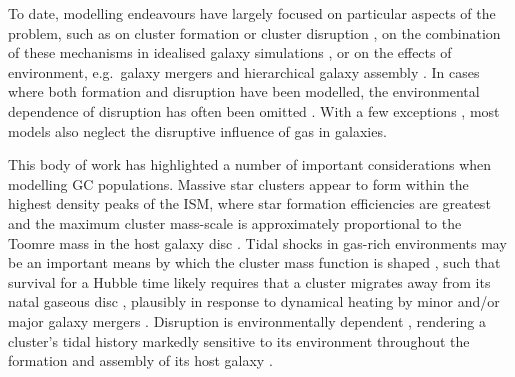\documentclass[fleqn,usenatbib]{mnras}
\begin{document}
To date, modelling endeavours have largely focused on particular aspects of the problem, such as on cluster formation \citep{Kravtsov_and_Gnedin_05, Katz_and_Ricotti_14, Li_and_Gnedin_14, Mistani_et_al_16, Li_et_al_17} or cluster disruption \citep{Gnedin_and_Ostriker_97, Vesperini_97, Baumgardt_98, Prieto_and_Gnedin_08, Rieder_et_al_13}, on the combination of these mechanisms in idealised galaxy simulations \citep{Kruijssen_et_al_11,Kruijssen_et_al_12}, or on the effects of environment, e.g.~galaxy mergers \citep{Li_MacLow_Klessen_04, Kruijssen_et_al_12, Renaud_and_Gieles_13, Renaud_Bournaud_and_Duc_15} and hierarchical galaxy assembly \citep{Beasley_et_al_02, Bekki_et_al_08, Griffen_et_al_10, Tonini_13, Renaud_Agertz_and_Gieles_17}. In cases where both formation and disruption have been modelled, the environmental dependence of disruption has often been omitted \citep{Muratov_and_Gnedin_10}. With a few exceptions \citep[e.g.][]{Elmegreen_10,Kruijssen_et_al_11,Kruijssen_et_al_12,Kruijssen_15}, most models also neglect the disruptive influence of gas in galaxies. 

This body of work has highlighted a number of important considerations when modelling GC populations. Massive star clusters appear to form within the highest density peaks of the ISM, where star formation efficiencies are greatest \citep{Elmegreen_and_Efremov_97, Elmegreen_08, Kruijssen_12} and the maximum cluster mass-scale is approximately proportional to the Toomre mass in the host galaxy disc \citep[but with important deviations, see][]{Reina-Campos_and_Kruijssen_17}. Tidal shocks in gas-rich environments may be an important means by which the cluster mass function is shaped \citep{Elmegreen_10, Kruijssen_15}, such that survival for a Hubble time likely requires that a cluster migrates away from its natal gaseous disc \citep{Kruijssen_14}, plausibly in response to dynamical heating by minor and/or major galaxy mergers \citep[e.g.][]{Kravtsov_and_Gnedin_05, Kruijssen_15}. Disruption is environmentally dependent \citep[e.g.][]{Baumgardt_and_Makino_03, Gieles_et_al_06, Kruijssen_et_al_11}, rendering a cluster's tidal history markedly sensitive to its environment throughout the formation and assembly of its host galaxy \citep{Prieto_and_Gnedin_08,Kruijssen_et_al_12, Rieder_et_al_13}.
\end{document}
